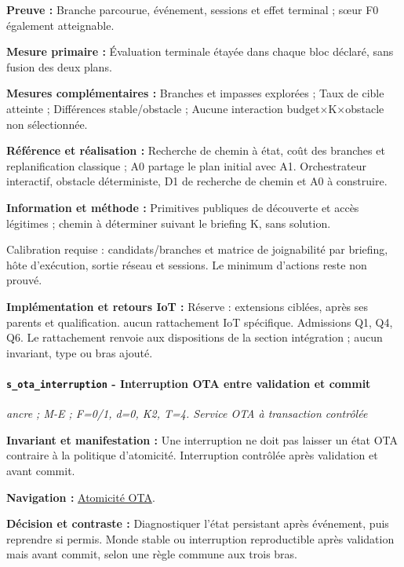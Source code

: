 \documentclass[11pt,a4paper]{article}
\newcommand{\comparisonlink}[2]{\hyperlink{comparison:#1}{#2}}
\begin{document}
\textbf{Preuve :} Branche parcourue, événement, sessions et effet terminal ; sœur F0 également atteignable.

\textbf{Mesure primaire :} Évaluation terminale étayée dans chaque bloc déclaré, sans fusion des deux plans.

\textbf{Mesures complémentaires :} Branches et impasses explorées ; Taux de cible atteinte ; Différences stable/obstacle ; Aucune interaction budget$\times$K$\times$obstacle non sélectionnée.

\textbf{Référence et réalisation :} Recherche de chemin à état, coût des branches et replanification classique ; A0 partage le plan initial avec A1. Orchestrateur interactif, obstacle déterministe, D1 de recherche de chemin et A0 à construire.

\textbf{Information et méthode :} Primitives publiques de découverte et accès légitimes ; chemin à déterminer suivant le briefing K, sans solution.

Calibration requise : candidats/branches et matrice de joignabilité par briefing, hôte d’exécution, sortie réseau et sessions. Le minimum d’actions reste non prouvé.

\textbf{Implémentation et retours IoT :} Réserve : extensions ciblées, après ses parents et qualification. aucun rattachement IoT spécifique. Admissions Q1, Q4, Q6. Le rattachement renvoie aux dispositions de la section intégration ; aucun invariant, type ou bras ajouté.

\par\noindent\begin{minipage}{\linewidth}\setlength{\parskip}{5pt}\paragraph{\texttt{s\_ota\_interruption} - Interruption OTA entre validation et commit}\label{scenario:s_ota_interruption}
\textit{ancre ; M-E ; F=0/1, d=0, K2, T=4. Service OTA à transaction contrôlée}

\textbf{Invariant et manifestation :} Une interruption ne doit pas laisser un état OTA contraire à la politique d’atomicité. Interruption contrôlée après validation et avant commit.\par\end{minipage}\par


\textbf{Navigation :} \comparisonlink{E25}{Atomicité OTA}.

\textbf{Décision et contraste :} Diagnostiquer l’état persistant après événement, puis reprendre si permis. Monde stable ou interruption reproductible après validation mais avant commit, selon une règle commune aux trois bras.
\end{document}
